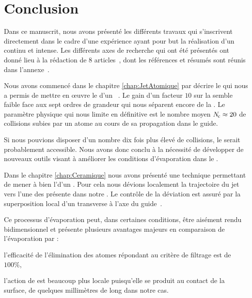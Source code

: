 \NumberThisInToc
\chapter*{Conclusion}\label{chap:Conclu}

Dans ce manuscrit, nous avons présenté les différents travaux qui s'inscrivent directement dans le cadre d'une expérience ayant pour but la réalisation d'un \lat continu et intense.
Les différents axes de recherche qui ont été présentés ont donné lieu à la rédaction de 8 articles~\cite{LWR05,LRW06,RWC06,RLC06,CKR08,RLW07,CJK08,ReG08}, dont les références et résumés sont réunis dans l'annexe~.


\newcommand{\figgg}[1]%
{#1}
\def\sssize{5.75cm}

\vspace{1ex}

\figgg{}
Nous avons commencé dans le chapitre \ref{chap:JetAtomique} par décrire le \setup qui nous a permis de mettre en \oe uvre le \rpef d'un \jatuf \mg~\cite{LWR05}. Le gain d'un facteur $10$ sur la \ddedp semble faible face aux sept ordres de grandeur qui nous séparent encore de la \condbe. Le paramètre physique qui nous limite en définitive est le nombre moyen ${N_{\hspace{-1pt}\rm c}}\approx20$ de collisions subies par un atome au cours de sa propagation dans le guide. 

Si nous pouvions disposer d'un nombre dix fois plus élevé de collisions, le \rdq serait probablement accessible. 
Nous avons donc conclu à la nécessité de développer de nouveaux outils visant à améliorer les conditions d'évaporation dans le \gm.

\vspace{1ex}
\vspace{1ex}

\figgg{}
Dans le chapitre \ref{chap:Ceramique} nous avons présenté une technique permettant de mener à bien l'\evap d'un \jatmg. Pour cela nous dévions localement la trajectoire du jet vers l'une des \pdecs présente dans notre \gm. 
Le contrôle de la déviation est assuré par la superposition local d'un \chm transverse à l'axe du guide~\cite{RLC06}. 

Ce processus d'évaporation peut, dans certaines conditions, être aisément rendu bidimensionnel et présente plusieurs avantages majeurs en comparaison de l'évaporation par \firf:
\begin{itemizel}
	\item l'efficacité de l'élimination des atomes répondant au critère de filtrage est de $100\%$,
	\item l'action de \fisp est beaucoup plus locale puisqu'elle se produit au contact de la surface, de quelques millimètres de long dans notre cas.
\end{itemizel}

